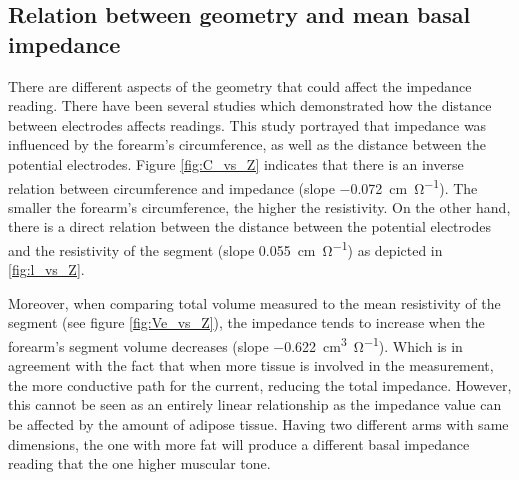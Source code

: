 \subsection{Relation between geometry and mean basal impedance}
\label{senction basal 2}
There are different aspects of the geometry that could affect the impedance reading. There have been several studies which demonstrated how the distance between electrodes affects readings. This study portrayed that impedance was influenced by the forearm's circumference, as well as the distance between the potential electrodes. Figure \ref{fig:C_vs_Z} indicates that there is an inverse relation between circumference and impedance (slope \SI{-0.072}{\centi\meter\per\ohm}). The smaller the forearm's circumference, the higher the resistivity. On the other hand, there is a direct relation between the distance between the potential electrodes and the resistivity of the segment (slope \SI{0.055}{\centi\meter\per\ohm}) as depicted in \ref{fig:l_vs_Z}.

Moreover, when comparing total volume measured to the mean resistivity of the segment (see figure \ref{fig:Ve_vs_Z}), the impedance tends to increase when the forearm's segment volume decreases (slope \SI{-0.622}{\cubic\centi\metre\per\ohm}). Which is in agreement with the fact that when more tissue is involved in the measurement, the more conductive path for the current, reducing the total impedance. However, this cannot be seen as an entirely linear relationship as the impedance value can be affected by the amount of adipose tissue. Having two different arms with same dimensions, the one with more fat will produce a different basal impedance reading that the one higher muscular tone. 

